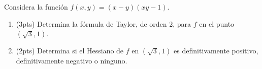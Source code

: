 \documentclass[12pt]{article}
\begin{document}
\bigskip

            
\bigskip
\bigskip
\bigskip


Considera la funci\'on $f(x,y)=(x-y)(xy-1)$.



\begin{enumerate}

\item (3pts) Determina la f\'ormula de Taylor, de orden 2, para $f$
  en el punto $(\sqrt{3},1)$.



  \vspace{8cm}


\item (2pts) Determina si el Hessiano de $f$ en $(\sqrt{3},1)$ es
  definitivamente positivo, definitivamente negativo o ninguno.


  

\end{enumerate}
 





  
\end{document}
